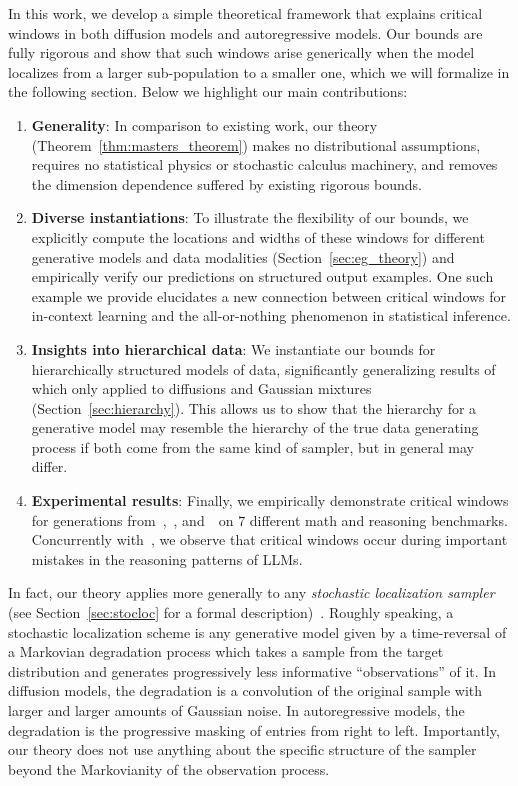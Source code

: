 In this work, we develop a simple theoretical framework that explains critical windows in both diffusion models and autoregressive models. Our bounds are fully rigorous and show that such windows arise generically when the model localizes from a larger sub-population to a smaller one, which we will formalize in the following section. Below we highlight our main contributions:
\begin{enumerate}
    \item \textbf{Generality}: In comparison to existing work, our theory (Theorem~\ref{thm:masters_theorem}) makes no distributional assumptions, requires no statistical physics or stochastic calculus machinery, and removes the dimension dependence suffered by existing rigorous bounds. \item \textbf{Diverse instantiations}: To illustrate the flexibility of our bounds, we explicitly compute the locations and widths of these windows for different generative models and data modalities (Section~\ref{sec:eg_theory}) and empirically verify our predictions on structured output examples. One such example we provide elucidates a new connection between critical windows for in-context learning and the all-or-nothing phenomenon in statistical inference.  
    \item \textbf{Insights into hierarchical data}: We instantiate our bounds for hierarchically structured models of data, significantly generalizing results of~\citep{li2024criticalwindowsnonasymptotictheory} which only applied to diffusions and Gaussian mixtures (Section~\ref{sec:hierarchy}). This allows us to show that the hierarchy for a generative model may resemble the hierarchy of the true data generating process if both come from the same kind of sampler, but in general may differ.
    \item \textbf{Experimental results}: Finally, we empirically demonstrate critical windows for generations from~\llamainstruct,~\phiinstruct, and~\qweninstruct~on $7$ different math and reasoning benchmarks. Concurrently with~\citep{abdin2024phi4technicalreport,lin2024criticaltokensmattertokenlevel}, we observe that critical windows occur during important mistakes in the reasoning patterns of LLMs.
\end{enumerate}

In fact, our theory applies more generally to any \emph{stochastic localization sampler} (see Section~\ref{sec:stocloc} for a formal description)~\cite{montanari2023samplingdiffusionsstochasticlocalization,chen2022localization}. Roughly speaking, a stochastic localization scheme is any generative model given by a time-reversal of a Markovian degradation process which takes a sample from the target distribution and generates progressively less informative ``observations'' of it. In diffusion models, the degradation is a convolution of the original sample with larger and larger amounts of Gaussian noise. In autoregressive models, the degradation is the progressive masking of entries from right to left. Importantly, our theory does not use anything about the specific structure of the sampler beyond the Markovianity of the observation process.

